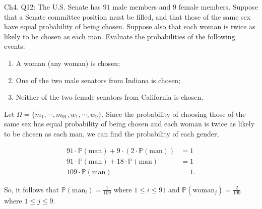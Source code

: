 \documentclass[12pt]{article}
\begin{document}

\noindent
Ch4. Q12: The U.S. Senate has $91$ male members and $9$ female members. Suppose that a Senate committee position must be filled, and that those of the same sex have equal probability of being chosen. Suppose also that each woman is twice as likely to be chosen as each man. Evaluate the probabilities of the following events:

\begin{center}
\begin{enumerate}[label=(\alph*)]
\item A woman (any woman) is chosen;
\item One of the two male senators from Indiana is chosen;
\item Neither of the two female senators from California is chosen.
\end{enumerate}
\end{center}

\noindent
Let $\Omega = \big \{ m_1, \cdots, m_{91}, w_1, \cdots, w_9 \big \}$. Since the probability of choosing those of the same sex has equal probability of being chosen and each woman is twice as likely to be chosen as each man, we can find the probability of each gender,

\begin{align*}
91 \cdot \mathbb{P}(\text{man}) + 9 \cdot ( 2 \cdot \mathbb{P}(\text{man}) ) &= 1 \\
91 \cdot \mathbb{P}(\text{man}) + 18 \cdot \mathbb{P}(\text{man})  &= 1 \\
109 \cdot \mathbb{P}(\text{man})  &= 1.
\end{align*}

\noindent
So, it follows that $\mathbb{P}(\text{man}_i)= \frac{1}{109}$ where $1 \leq i \leq 91$ and $\mathbb{P}(\text{woman}_j)= \frac{2}{109}$ where $1 \leq j \leq 9$.
\end{document}
